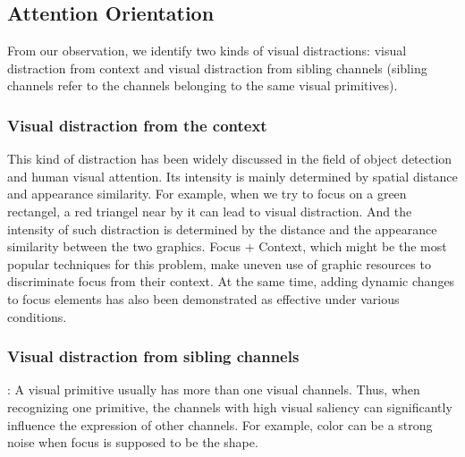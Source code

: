 \subsection{Attention Orientation}
From our observation, we identify two kinds of visual distractions: visual distraction from context and visual distraction from sibling channels (sibling channels refer to the channels belonging to the same visual primitives). \par
\subsubsection{Visual distraction from the context}
This kind of distraction has been widely discussed in the field of object detection and human visual attention. \cite{nothdurft_salience_2000, standage_modelling_2005}Its intensity is mainly  determined by spatial distance and appearance similarity. \cite{wolfe_guided_1994}For example, when we try to focus on a green rectangel, a red triangel near by it can lead to visual distraction. And the intensity of such distraction is determined by the distance and the appearance similarity between the two graphics. Focus + Context, which might be the most popular techniques for this problem, make uneven use of graphic resources to discriminate focus from their context. At the same time, adding dynamic changes to focus elements has also been demonstrated as effective under various conditions\cite{waldner_attractive_2014}. 

\subsubsection{Visual distraction from sibling channels}: A visual primitive usually has more than one visual channels. Thus, when recognizing one primitive, the channels with high visual saliency can significantly influence the expression of other channels. For example, color can be a strong noise when focus is supposed to be the shape.

